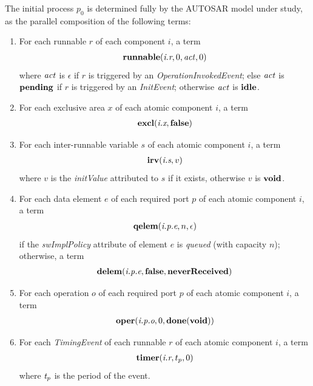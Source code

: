 \documentclass[twocolumn]{article}
\begin{document}
The initial process $p_0$ is determined fully by the AUTOSAR model under study, as the parallel composition of the following terms:
\begin{enumerate}

\item For each runnable $r$ of each component $i$, a term
\[
\begin{array}{c}
  \Trunnable {\Tr r i} 0 \Act 0
\end{array}
\]
where $\Act$ is $\epsilon$ if $r$ is triggered by an \emph{OperationInvokedEvent}; else $\Act$ is $\Tpending$ if $r$ is triggered by an \emph{InitEvent}; otherwise $\Act$ is $\Tidle$.

\item For each exclusive area $x$ of each atomic component $i$, a term
\[
\begin{array}{c}
  \Texcl {\Tx x i} \Tfalse
\end{array}
\]

\item For each inter-runnable variable $s$ of each atomic component $i$, a term
\[
\begin{array}{c}
  \Tirv {\Ts s i} v
\end{array}
\]
where $v$ is the \emph{initValue} attributed to $s$ if it exists, otherwise $v$ is $\Tvoid$.

\item For each data element $e$ of each required port $p$ of each atomic component $i$, a term
\[
\begin{array}{c}
  \Tqelem {\Tep e p i} n \epsilon
\end{array}
\]
if the \emph{swImplPolicy} attribute of element $e$ is \emph{queued} (with capacity $n$); otherwise, a term
\[
\begin{array}{c}
  \Tdelem {\Tep e p i} \Tfalse \TneverReceived
\end{array}
\]

\item For each operation $o$ of each required port $p$ of each atomic component $i$, a term
\[
\begin{array}{c}
  \Toper{\Top o p i} 0 {\Tdone \Tvoid}
\end{array}
\]

\item For each \emph{TimingEvent} of each runnable $r$ of each atomic component $i$, a term
\[
\begin{array}{c}
  \Ttimer {\Tr r i } {t_p} 0
\end{array}
\]
where $\V{T_p}$ is the period of the event.

\end{enumerate}
\end{document}
